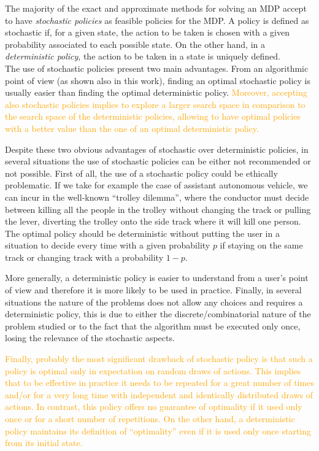 \documentclass[sigconf]{aamas}  %
\newcommand{\PA}[1]{{\textcolor{orange}{#1}}}
\begin{document}
The majority of the exact and approximate methods for solving an MDP accept to have \textit{stochastic policies} as feasible policies for the MDP. A policy is defined as stochastic if, for a given state, the action to be taken is chosen with a given probability associated to each possible state.
On the other hand, in a \textit{deterministic policy}, the action to be taken in a state is uniquely defined.\\
The use of stochastic policies present two main advantages. From an algorithmic point of view (as shown also in this work), finding an optimal stochastic policy is usually easier than finding the optimal deterministic policy. \PA{Moreover, accepting also stochastic policies implies to explore a larger search space in comparison to the search space of the deterministic policies, allowing to have optimal policies with a better value than the one of an optimal deterministic policy.}

Despite these two obvious advantages of stochastic over deterministic policies, in several situations the use of stochastic policies can be either not recommended or not possible. 
%
%
First of all, the use of a stochastic policy could be ethically problematic. If we take for example the case of assistant autonomous vehicle, we can incur in the well-known ``trolley dilemma'', where the conductor must decide between killing all the people in the trolley without changing the track or pulling the lever, diverting the trolley onto the side track where it will kill one person. The optimal policy should be deterministic without putting the user in a situation to decide every time with a given probability $p$ if staying on the same track or changing track with a probability $1-p$. 

More generally, a deterministic policy is easier to understand from a user's point of view and therefore it is more likely to be used in practice. Finally, in several situations the nature of the problems does not allow any choices and requires a deterministic policy, this is due to either the discrete/combinatorial nature of the problem studied or to the fact that the algorithm must be executed only once, losing the relevance of the stochastic aspects. 

\PA{Finally, probably the most significant drawback of stochastic policy is that  such a policy is  optimal only in expectation on random draws of actions. This implies that to be effective in practice it needs to be repeated for a great number of times and/or for a very long time with independent and identically distributed draws of actions. In contrast, this policy offers no guarantee of optimality if it used only once or for a short number of repetitions. On the other hand, a deterministic policy maintains its definition of ``optimality'' even if it is used only once starting from its initial state.}
\end{document}
